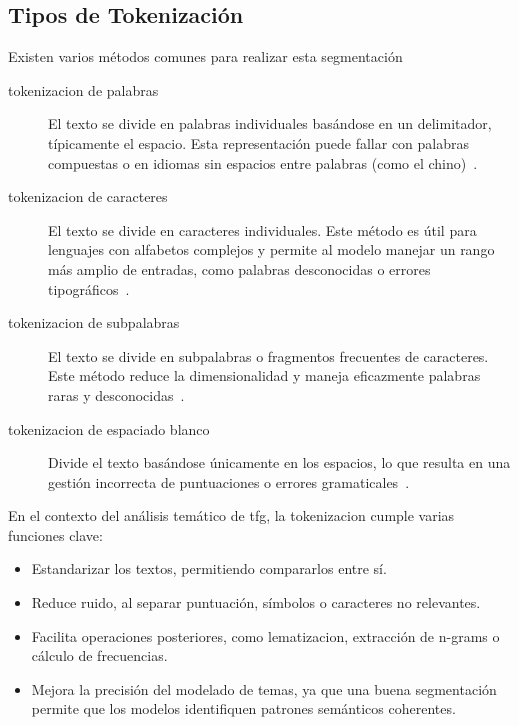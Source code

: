 \subsection{Tipos de Tokenización}
Existen varios métodos comunes para realizar esta segmentación

\begin{description}
	\item[\gls{tokenizacion} de palabras] El texto se divide en palabras individuales basándose
	      en un delimitador, típicamente el espacio. Esta representación puede fallar con
	      palabras compuestas o en idiomas sin espacios entre palabras (como el
	      chino)~\cite{gewarrenDescripcionTokensNET}.
	\item[\gls{tokenizacion} de caracteres] El texto se divide en caracteres individuales. Este
	      método es útil para lenguajes con alfabetos complejos y permite al modelo
	      manejar un rango más amplio de entradas, como palabras desconocidas o errores
	      tipográficos~\cite{josefatRevisionSistematicaTecnicas,
		      gewarrenDescripcionTokensNET}.
	\item[\gls{tokenizacion} de subpalabras] El texto se divide en subpalabras o fragmentos
	      frecuentes de caracteres. Este método reduce la dimensionalidad y maneja
	      eficazmente palabras raras y
	      desconocidas~\cite{josefatRevisionSistematicaTecnicas,
		      gewarrenDescripcionTokensNET}.
	\item[\gls{tokenizacion} de espaciado blanco] Divide el texto basándose únicamente en los
	      espacios, lo que resulta en una gestión incorrecta de puntuaciones o errores
	      gramaticales~\cite{josefatRevisionSistematicaTecnicas}.
\end{description}

En el contexto del análisis temático de \acrshort{tfg}, la \gls{tokenizacion}
cumple varias funciones clave:
\begin{itemize}
	\item Estandarizar los textos, permitiendo compararlos entre sí.
	\item Reduce ruido, al separar puntuación, símbolos o caracteres no relevantes.
	\item Facilita operaciones posteriores, como \gls{lematizacion}, extracción de
	      n-grams o cálculo de frecuencias.
	\item Mejora la precisión del modelado de temas, ya que una buena segmentación
	      permite que los modelos identifiquen patrones semánticos coherentes.
\end{itemize}

